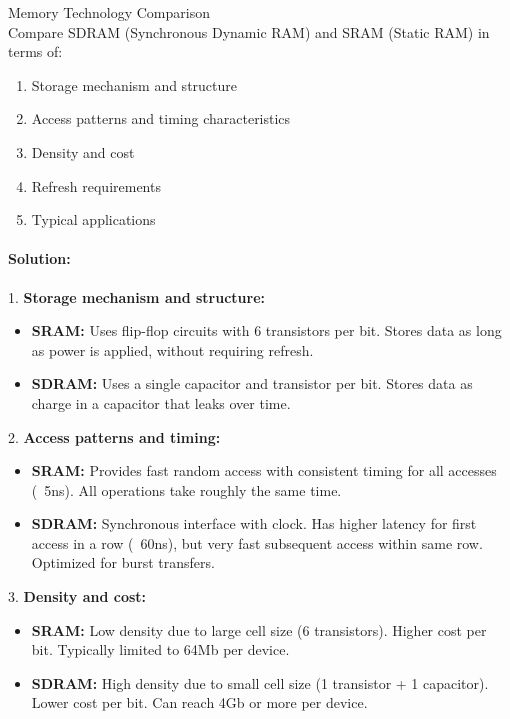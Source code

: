 \begin{example2}{Memory Technology Comparison}\\
Compare SDRAM (Synchronous Dynamic RAM) and SRAM (Static RAM) in terms of:
\begin{enumerate}
    \item Storage mechanism and structure
    \item Access patterns and timing characteristics
    \item Density and cost
    \item Refresh requirements
    \item Typical applications
\end{enumerate}

\tcblower
\paragraph{Solution:}

1. \textbf{Storage mechanism and structure:}
   \begin{itemize}
     \item \textbf{SRAM:} Uses flip-flop circuits with 6 transistors per bit. Stores data as long as power is applied, without requiring refresh.
     \item \textbf{SDRAM:} Uses a single capacitor and transistor per bit. Stores data as charge in a capacitor that leaks over time.
   \end{itemize}

2. \textbf{Access patterns and timing:}
   \begin{itemize}
     \item \textbf{SRAM:} Provides fast random access with consistent timing for all accesses (~5ns). All operations take roughly the same time.
     \item \textbf{SDRAM:} Synchronous interface with clock. Has higher latency for first access in a row (~60ns), but very fast subsequent access within same row. Optimized for burst transfers.
   \end{itemize}

3. \textbf{Density and cost:}
   \begin{itemize}
     \item \textbf{SRAM:} Low density due to large cell size (6 transistors). Higher cost per bit. Typically limited to 64Mb per device.
     \item \textbf{SDRAM:} High density due to small cell size (1 transistor + 1 capacitor). Lower cost per bit. Can reach 4Gb or more per device.
   \end{itemize}


\end{example2}
